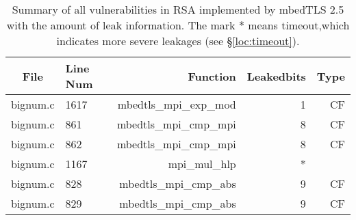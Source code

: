 \begin{table}%
\centering\tiny
\caption{Summary of all vulnerabilities in RSA implemented by mbedTLS 2.5 with the amount of leak information. The mark $*$ means timeout,which indicates more severe leakages (see \S\ref{loc:timeout}).}\label{tab:RSAmbedTLS}
\begin{tabular}{clrrr}
\hline
\textbf{File} & \textbf{Line Num} & \textbf{Function} & \textbf{Leakedbits} & \textbf{Type} \\\hline
bignum.c& 1617&mbedtls\_mpi\_exp\_mod&1 &CF\\
bignum.c& 861&mbedtls\_mpi\_cmp\_mpi&8 &CF\\
bignum.c& 862&mbedtls\_mpi\_cmp\_mpi&8 &CF\\
bignum.c& 1167&mpi\_mul\_hlp&*&\\
bignum.c& 828&mbedtls\_mpi\_cmp\_abs&9 &CF\\
bignum.c& 829&mbedtls\_mpi\_cmp\_abs&9 &CF\\
\hline
\end{tabular}
\end{table}